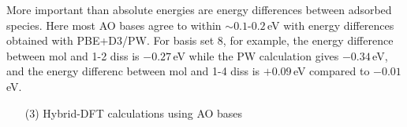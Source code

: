 \documentclass[11pt,DIV=13,BCOR=5mm,a4paper,headinclude]{scrbook}
\begin{document}
More important than absolute energies are energy differences between adsorbed species.
Here most AO bases agree to within $\sim 0.1$-$0.2\,$eV with energy differences obtained with PBE+D3/PW.
For basis set 8, for example, the energy difference between mol and 1-2 diss is $-0.27\,$eV while the PW calculation gives $-0.34\,$eV, and the energy differenc between mol and 1-4 diss is $+0.09\,$eV compared to $-0.01\,$eV.

\begin{enumerate}
 \item[(3)] Hybrid-DFT calculations using AO bases
\end{enumerate}
\end{document}
